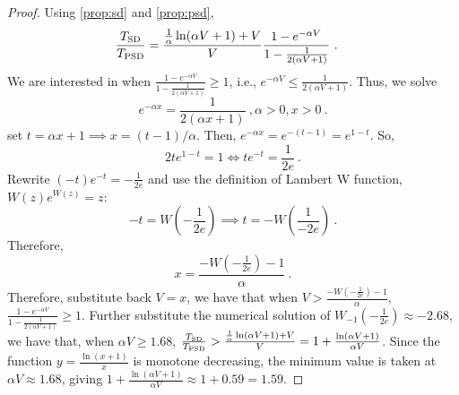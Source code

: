 \ratio*
\begin{proof}
    Using \cref{prop:sd} and \cref{prop:psd}, 
    \begin{equation*}
        \begin{aligned}
        \frac{T_{\textnormal{\text{SD}}}}{T_{\textnormal{\text{PSD}}}} &= \frac{\frac{1}{\alpha}\ln(\alpha V + 1) + V}{V}\frac{1-e^{-\alpha V}}{1-\frac{1}{2(\alpha V + 1)}}\ .    
        \end{aligned}
    \end{equation*}
    We are interested in when $\frac{1-e^{-\alpha V}}{1-\frac{1}{2(\alpha V + 1)}} \geq 1$, i.e., $e^{-\alpha V} \leq \frac{1}{2(\alpha V+1)}$. Thus, we solve
    \begin{equation*}
        e^{-\alpha x} = \frac{1}{2(\alpha x+1)}\ , \alpha > 0, x > 0\ .
    \end{equation*}
    set $t = \alpha x + 1 \implies x = (t-1)/\alpha$. Then, $e^{-\alpha x} = e^{-(t-1)} = e^{1-t}$. So,
    \begin{equation*}
        2te^{1-t}=1 \iff te^{-t}=\frac{1}{2e}\ .
    \end{equation*}
    Rewrite $(-t)e^{-t}=-\frac{1}{2e}$ and use the definition of Lambert W function, $W(z)e^{W(z)}=z$:
    \begin{equation*}
        -t = W(-\frac{1}{2e}) \implies t = -W(\frac{1}{-2e})\ .
    \end{equation*}
    Therefore,
    \begin{equation*}
        x = \frac{-W(-\frac{1}{2e}) - 1}{\alpha}\ .
    \end{equation*}
    Therefore, substitute back $V = x$, we have that when $V > \frac{-W(-\frac{1}{2e}) - 1}{\alpha}$, $\frac{1-e^{-\alpha V}}{1-\frac{1}{2(\alpha V + 1)}} \geq 1$. Further substitute the numerical solution of $W_{-1}(-\frac{1}{2e}) \approx -2.68$, we have that, when $\alpha V \geq 1.68$, $\frac{T_{\textnormal{\text{SD}}}}{T_{\textnormal{\text{PSD}}}} > \frac{\frac{1}{\alpha}\ln(\alpha V+1)+V}{V} = 1+\frac{\ln(\alpha V+1)}{\alpha V}$. Since the function $y = \frac{\ln(x+1)}{x}$ is monotone decreasing, the minimum value is taken at $\alpha V \approx 1.68$, giving $1+\frac{\ln(\alpha V + 1)}{\alpha V} \approx 1 + 0.59 = 1.59$.
\end{proof}